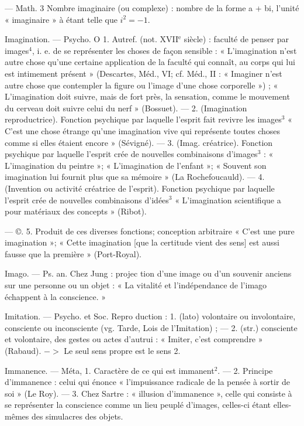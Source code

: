 — Math. 3 Nombre imaginaire
(ou complexe) : nombre de la forme
a + bi, l'unité « imaginaire » à étant
telle que $i^2 = - 1$.

Imagination. — Psycho. O 1. Autref.
(not. {\footnotesize XVII}$^\text{e}$ siècle) : faculté de penser
par images$^4$, i. e. de se représenter
les choses de façon sensible : « L’imagination n’est autre chose qu’une certaine application de la faculté qui
connaît, au corps qui lui est intimement présent » (Descartes, Méd.,
VI; cf. Méd., II : « Imaginer n'est
autre chose que contempler la
figure ou l’image d’une chose corporelle ») ; « L’imagination doit suivre,
mais de fort près, la sensation,
comme le mouvement du cerveau
doit suivre celui du nerf » (Bossuet).
— 2. (Imagination reproductrice).
Fonction psychique par laquelle
l'esprit fait revivre les images$^3$
« C’est une chose étrange qu’une
imagination vive qui représente
toutes choses comme si elles étaient
encore » (Sévigné). — 3. (Imag.
créatrice). Fonction psychique par
laquelle l'esprit crée de nouvelles
combinaisons d'images$^3$ : « L’imagination du peintre »; « L’imagination
de l'enfant »; « Souvent son imagination lui fournit plus que sa mémoire »
(La Rochefoucauld). —
4. (Invention ou activité créatrice
de l'esprit). Fonction psychique
par laquelle l'esprit crée de nouvelles combinaisons  d’idées$^3$
« L’imagination scientifique a pour
matériaux des concepts » (Ribot).

— ©. 5. Produit de ces diverses
fonctions; conception arbitraire
« C’est une pure imagination »;
« Cette imagination [que la certitude vient des sens] est aussi fausse
que la première » (Port-Royal).

Imago. — Ps. an. Chez Jung : projec
tion d’une image ou d’un souvenir
anciens sur une personne ou un
objet : « La vitalité et l’indépendance de l'imago échappent à la
conscience. »

Imitation. — Psycho. et Soc. Repro
duction : 1. (lato) volontaire ou involontaire, consciente ou inconsciente (vg. Tarde, Lois de l’Imitation) ; — 2. (str.) consciente et volontaire, des gestes ou actes d’autrui :
« Imiter, c’est comprendre » (Rabaud). $->$ Le seul sens propre est
le sens 2.

Immanence. — Méta, 1. Caractère de
ce qui est immanent$^2$. — 2. Principe d'immanence : celui qui énonce
« l'impuissance radicale de la pensée
à sortir de soi » (Le Roy). — 3. Chez
Sartre : « illusion d’immanence »,
celle qui consiste à se représenter la
conscience comme un lieu peuplé
d'images, celles-ci étant elles-mêmes
des simulacres des objets.


